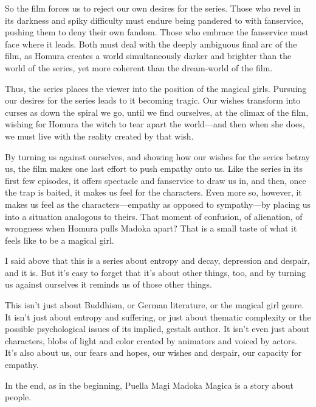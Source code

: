 So the film forces us to reject our own desires for the series. Those who revel in its darkness and spiky difficulty must endure being pandered to with fanservice, pushing them to deny their own fandom. Those who embrace the fanservice must face where it leads. Both must deal with the deeply ambiguous final arc of the film, as Homura creates a world simultaneously darker and brighter than the world of the series, yet more coherent than the dream-world of the film.

Thus, the series places the viewer into the position of the magical girls. Pursuing our desires for the series leads to it becoming tragic. Our wishes transform into curses as down the spiral we go, until we find ourselves, at the climax of the film, wishing for Homura the witch to tear apart the world—and then when she does, we must live with the reality created by that wish.

By turning us against ourselves, and showing how our wishes for the series betray us, the film makes one last effort to push empathy onto us. Like the series in its first few episodes, it offers spectacle and fanservice to draw us in, and then, once the trap is baited, it makes us feel for the characters. Even more so, however, it makes us feel as the characters—empathy as opposed to sympathy—by placing us into a situation analogous to theirs. That moment of confusion, of alienation, of wrongness when Homura pulls Madoka apart? That is a small taste of what it feels like to be a magical girl.

I said above that this is a series about entropy and decay, depression and despair, and it is. But it's easy to forget that it's about other things, too, and by turning us against ourselves it reminds us of those other things.

This isn't just about Buddhism, or German literature, or the magical girl genre. It isn't just about entropy and suffering, or just about thematic complexity or the possible psychological issues of its implied, gestalt author. It isn't even just about characters, blobs of light and color created by animators and voiced by actors. It's also about us, our fears and hopes, our wishes and despair, our capacity for empathy.

In the end, as in the beginning, Puella Magi Madoka Magica is a story about people.

